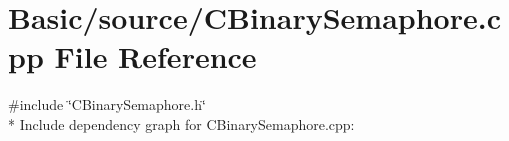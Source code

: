 \section{Basic/source/\-C\-Binary\-Semaphore.cpp File Reference}
\label{CBinarySemaphore_8cpp}
{\ttfamily \#include \char`\"{}C\-Binary\-Semaphore.\-h\char`\"{}}\\*
Include dependency graph for C\-Binary\-Semaphore.\-cpp\-:

